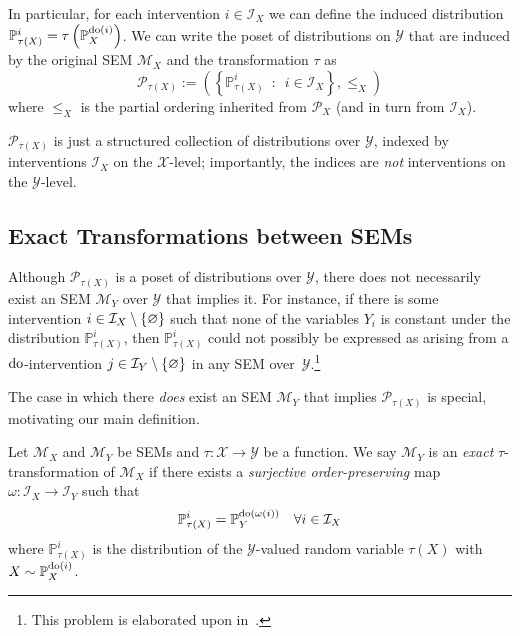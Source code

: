 In particular, for each intervention $i \in \mathcal{I}_X$ we can define the induced distribution $\mathbb{P}_{\tau(X)}^{i} = \tau\left(\mathbb{P}_X^{\operatorname{do}(i)}\right)$.
We can write the poset of distributions on $\mathcal{Y}$ that are induced by the original SEM $\mathcal{M}_X$ and the transformation $\tau$ as
\[\mathcal{P}_{\tau(X)} := \left( \left\{ \mathbb{P}_{\tau(X)}^{i} \enspace : \enspace i \in \mathcal{I}_X \right\}, \leq_X \right) \]
where $\leq_X$ is the partial ordering inherited from $\mathcal{P}_X$ (and in turn from $\mathcal{I}_X$).

$\mathcal{P}_{\tau(X)}$ is just a structured collection of distributions over $\mathcal{Y}$, indexed by interventions $\mathcal{I}_X$ on the $\mathcal{X}$-level; importantly, the indices are \emph{not} interventions on the $\mathcal{Y}$-level.

\subsection{Exact Transformations between SEMs}\label{sec:exact_transformation_sem}

Although $\mathcal{P}_{\tau(X)}$ is a poset of distributions over $\mathcal{Y}$, there does not necessarily exist an SEM $\mathcal{M}_Y$ over $\mathcal{Y}$ that implies it.
For instance, if there is some intervention ${i \in \mathcal{I}_X \setminus \{ \varnothing \}}$ such that none of the variables $Y_i$ is constant under the distribution $\mathbb{P}_{\tau(X)}^{i}$, then $\mathbb{P}_{\tau(X)}^{i}$ could not possibly be expressed as arising from a $\operatorname{do}$-intervention $j\in \mathcal{I}_Y \setminus \{\varnothing\}$ in any SEM over~$\mathcal{Y}$.\footnote{This problem is elaborated upon in~\cite{eberhardt2016green}.}

The case in which there \emph{does} exist an SEM $\mathcal{M}_Y$ that implies $\mathcal{P}_{\tau(X)}$ is special, motivating our main definition.

\begin{definition}\label{def:exacttrafos}
Let $\mathcal{M}_X$ and $\mathcal{M}_Y$ be SEMs and $\tau: \mathcal{X} \to \mathcal{Y}$ be a function.
We say $\mathcal{M}_Y$ is an \emph{exact}  $\tau$-transformation of $\mathcal{M}_X$ if there exists a \emph{surjective order-preserving} map $\omega:\mathcal{I}_X\rightarrow \mathcal{I}_Y$ such that
\[ \mathbb{P}_{\tau(X)}^{i} = \mathbb{P}_Y^{\operatorname{do}(\omega(i))} \quad \forall i \in \mathcal{I}_X \]
where $\mathbb{P}_{\tau(X)}^{i}$ is the distribution of the $\mathcal{Y}$-valued random variable $\tau(X)$ with $X \sim \mathbb{P}_X^{\operatorname{do}(i)}$.
\end{definition}

